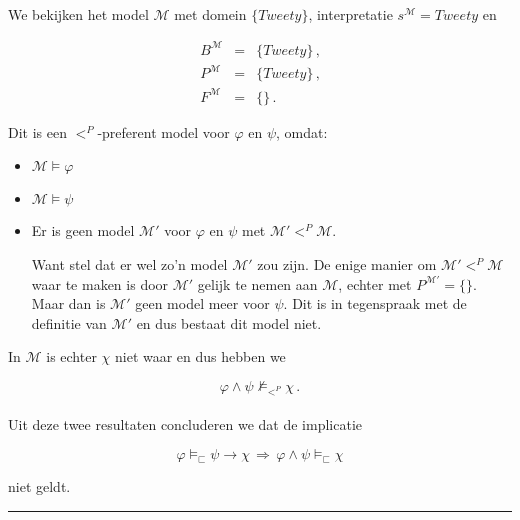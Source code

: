 \documentclass[a4paper,11pt]{article}
\begin{document}
\paragraph{}

We bekijken het model $\mathcal{M}$ met domein $\{Tweety\}$, interpretatie
$s^{\mathcal{M}} = Tweety$ en

\begin{eqnarray*}
B^{\mathcal{M}} & = & \{Tweety\} \, \mbox{,} \\
P^{\mathcal{M}} & = & \{Tweety\} \, \mbox{,} \\
F^{\mathcal{M}} & = & \{\} \, \mbox{.}
\end{eqnarray*}

Dit is een $<^{P}$-preferent model voor $\varphi$ en $\psi$, omdat:

\begin{itemize}

\item $\mathcal{M} \vDash \varphi$
\item $\mathcal{M} \vDash \psi$
\item Er is geen model $\mathcal{M}'$ voor $\varphi$ en $\psi$ met
  $\mathcal{M}' <^{P} \mathcal{M}$.

Want stel dat er wel zo'n model $\mathcal{M}'$ zou zijn. De enige manier om
$\mathcal{M}' <^{P} \mathcal{M}$ waar te maken is door $\mathcal{M}'$ gelijk
te nemen aan $\mathcal{M}$, echter met $P^{\mathcal{M}'} = \{\}$. Maar dan is
$\mathcal{M}'$ geen model meer voor $\psi$. Dit is in tegenspraak met de
definitie van $\mathcal{M}'$ en dus bestaat dit model niet.

\end{itemize}

In $\mathcal{M}$ is echter $\chi$ niet waar en dus hebben we

\begin{displaymath}
\varphi \wedge \psi \nvDash_{<^{P}} \chi \, \mbox{.}
\end{displaymath}

\paragraph{}

Uit deze twee resultaten concluderen we dat de implicatie

\begin{displaymath}
\varphi \vDash_{\sqsubset} \psi \rightarrow \chi
\, \Longrightarrow \,
\varphi \wedge \psi \vDash_{\sqsubset} \chi
\end{displaymath}

niet geldt.

\hfill\rule{2.1mm}{2.mm}
\end{document}
